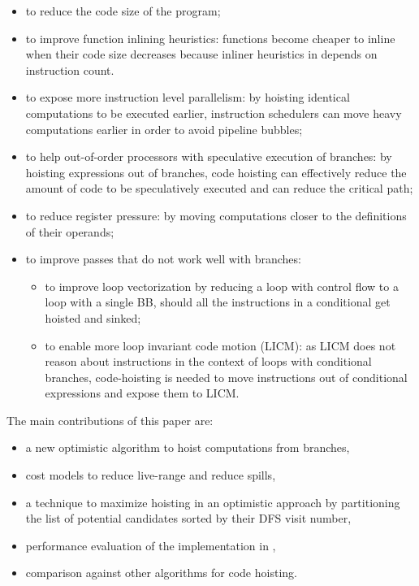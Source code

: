 \documentclass{sig-alternate}
\begin{document}
\begin{itemize}
\item to reduce the code size of the program;
\item to improve function inlining heuristics: functions become cheaper to
  inline when their code size decreases because inliner heuristics in \LLVM{}
  depends on instruction count.
\item to expose more instruction level parallelism: by hoisting identical
  computations to be executed earlier, instruction schedulers can move heavy
  computations earlier in order to avoid pipeline bubbles;
\item to help out-of-order processors with speculative execution of branches: by
  hoisting expressions out of branches, code hoisting can effectively reduce the
  amount of code to be speculatively executed and can reduce the critical path;
\item to reduce register pressure: by moving computations closer to the
  definitions of their operands;
\item to improve passes that do not work well with branches:
  \begin{itemize}
  \item to improve loop vectorization by reducing a loop with control flow to a
    loop with a single BB, should all the instructions in a conditional get
    hoisted and sinked;
  \item to enable more loop invariant code motion (LICM): as LICM does not
    reason about instructions in the context of loops with conditional branches,
    code-hoisting is needed to move instructions out of conditional expressions
    and expose them to LICM.
  \end{itemize}
\end{itemize}

The main contributions of this paper are:
\begin{itemize}
\item a new optimistic algorithm to hoist computations from branches,
\item cost models to reduce live-range and reduce spills,
\item a technique to maximize hoisting in an optimistic approach by partitioning
  the list of potential candidates sorted by their DFS visit number,
\item performance evaluation of the implementation in \LLVM{},
\item comparison against other algorithms for code hoisting.
\end{itemize}
\end{document}
